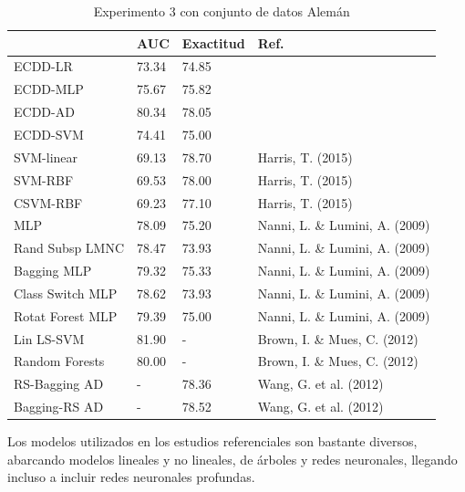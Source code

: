 \begin{table}[htbp]
\centering
\caption{Experimento 3 con conjunto de datos Alemán}
\label{tab:german-proc3}
\begin{tabularx}{\textwidth}{|l|Y Y l|}
						\hline
						& AUC		& Exactitud	& Ref.									\\
						\hline
ECDD-LR					& 73.34		& 74.85		&										\\		%
ECDD-MLP				& 75.67		& 75.82		&										\\		%
ECDD-AD					& 80.34		& 78.05		&										\\		%
ECDD-SVM				& 74.41		& 75.00		&										\\		%
						\hline
SVM-linear				& 69.13		& 78.70		& Harris, T. (2015)						\\		%
SVM-RBF					& 69.53		& 78.00		& Harris, T. (2015)						\\		%
CSVM-RBF				& 69.23		& 77.10		& Harris, T. (2015)						\\		%
MLP						& 78.09		& 75.20		& Nanni, L. \& Lumini, A. (2009)		\\		%
Rand Subsp LMNC			& 78.47		& 73.93		& Nanni, L. \& Lumini, A. (2009)		\\		%
Bagging MLP				& 79.32		& 75.33		& Nanni, L. \& Lumini, A. (2009)		\\		%
Class Switch MLP		& 78.62		& 73.93		& Nanni, L. \& Lumini, A. (2009)		\\		%
Rotat Forest MLP		& 79.39		& 75.00		& Nanni, L. \& Lumini, A. (2009)		\\		%
Lin LS-SVM				& 81.90		& -			& Brown, I. \& Mues, C. (2012)			\\		%
Random Forests			& 80.00		& -			& Brown, I. \& Mues, C. (2012)			\\		%
RS-Bagging AD			& -			& 78.36		& Wang, G. et al. (2012)				\\		%
Bagging-RS AD			& -			& 78.52		& Wang, G. et al. (2012)				\\		%
						\hline
\end{tabularx}
\par
\end{table}


Los modelos utilizados en los estudios referenciales son bastante diversos, abarcando modelos lineales y no lineales, de árboles y redes neuronales, llegando incluso a incluir redes neuronales profundas.

